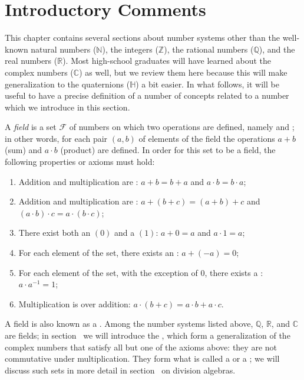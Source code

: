 \section{Introductory Comments}

This chapter contains several sections about number systems other than the well-known natural numbers ($\mathbb{N}$), the integers ($\mathbb{Z}$),
the rational numbers ($\mathbb{Q}$), and the real numbers ($\mathbb{R}$).  Most high-school graduates will have learned about the complex numbers ($\mathbb{C}$) as well, but we review them here because this will make generalization to the quaternions ($\mathbb{H}$) a bit easier.  In what follows, it will be useful to have a precise definition of a number of concepts related to a number  which we introduce in this section.

A \textit{field} is a set $\mathcal{F}$ of numbers on which two operations are defined, namely  and ; in other words, for each pair $(a,b)$ of elements of the field the operations $a+b$ (sum) and $a\cdot b$ (product) are defined.  In order for this set to be a field, the following properties or axioms must hold:
\begin{enumerate}
\item Addition and multiplication are : $a+b=b+a$ and $a\cdot b=b\cdot a$;
\item Addition and multiplication are : $a+(b+c)=(a+b)+c$ and $(a\cdot b)\cdot c=a\cdot (b\cdot c)$;
\item There exist both an  $(0)$ and a  $(1)$: $a+0=a$ and $a\cdot 1=a$;
\item For each element of the set, there exists an : $a+(-a)=0$;
\item For each element of the set, with the exception of $0$, there exists a : $a\cdot a^{-1} = 1$;
\item Multiplication is  over addition: $a\cdot(b+c)=a\cdot b+a\cdot c$.
\end{enumerate}
A field is also known as a .  Among the number systems listed above, $\mathbb{Q}$, $\mathbb{R}$, and $\mathbb{C}$ are fields; in section~ we will introduce the , which form a generalization of the complex numbers that satisfy all but one of the axioms above: they are not commutative under multiplication.  They form what is called a  or a ; we will discuss such sets in more detail in section~ on division algebras.


